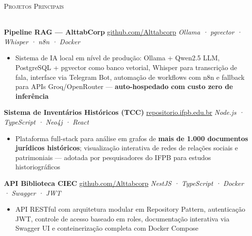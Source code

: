 \documentclass[a4paper]{article}
\newcommand{\lineunder}{
    \vspace*{-8pt} \\
    \hspace*{-18pt} \hrulefill \\
}
\newcommand{\header}[1]{
    {\hspace*{-18pt}\vspace*{6pt} \textsc{#1}}
    \vspace*{-6pt} \lineunder
}
\begin{document}
\vspace{3mm}

\header{Projetos Principais}
\vspace{2mm}

\textbf{Pipeline RAG — AlttabCorp}
\hfill {\small \href{https://github.com/Alttabcorp}{github.com/Alttabcorp}}
\hfill {\sl Ollama · pgvector · Whisper · n8n · Docker}\\
\vspace{-3mm}
\begin{itemize}[leftmargin=*, itemsep=-2pt]
    \item Sistema de IA local em nível de produção: Ollama + Qwen2.5 LLM, PostgreSQL + pgvector como banco vetorial, Whisper para transcrição de fala, interface via Telegram Bot,
     automação de workflows com n8n e fallback para APIs Groq/OpenRouter — \textbf{auto-hospedado com custo zero de inferência}
\end{itemize}
\vspace{2mm}

\textbf{Sistema de Inventários Históricos (TCC)}
\hfill {\small \href{https://repositorio.ifpb.edu.br/handle/177683/2898}{repositorio.ifpb.edu.br}}
\hfill {\sl Node.js · TypeScript · Neo4j · React}\\
\vspace{-3mm}
\begin{itemize}[leftmargin=*, itemsep=-2pt]
    \item Plataforma full-stack para análise em grafos de \textbf{mais de 1.000 documentos jurídicos históricos}; 
    visualização interativa de redes de relações sociais e patrimoniais — adotada por pesquisadores do IFPB para estudos historiográficos
\end{itemize}
\vspace{2mm}

\textbf{API Biblioteca CIEC}
\hfill {\small \href{https://github.com/Alttabcorp/API-bibliteca_siec}{github.com/Alttabcorp}}
\hfill {\sl NestJS · TypeScript · Docker · Swagger · JWT}\\
\vspace{-3mm}
\begin{itemize}[leftmargin=*, itemsep=-2pt]
    \item API RESTful com arquitetura modular em Repository Pattern, autenticação JWT, controle de acesso baseado em roles, documentação interativa via Swagger UI e conteinerização completa com Docker Compose
\end{itemize}
\vspace{2mm}
\end{document}
